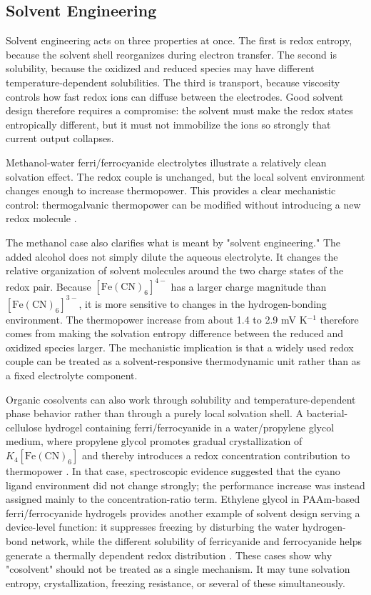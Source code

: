 \documentclass[a4paper,12pt]{report}
\begin{document}
\subsection{Solvent Engineering}

Solvent engineering acts on three properties at once. The first is redox
entropy, because the solvent shell reorganizes during electron transfer. The
second is solubility, because the oxidized and reduced species may have
different temperature-dependent solubilities. The third is transport, because
viscosity controls how fast redox ions can diffuse between the electrodes.
Good solvent design therefore requires a compromise: the solvent must make the
redox states entropically different, but it must not immobilize the ions so
strongly that current output collapses.

Methanol-water ferri/ferrocyanide electrolytes illustrate a relatively clean
solvation effect. The redox couple is unchanged, but the local solvent
environment changes enough to increase thermopower. This provides a clear
mechanistic control: thermogalvanic thermopower can be modified
without introducing a new redox molecule \citep{kim2017high}.

The methanol case also clarifies what is meant by "solvent engineering." The
added alcohol does not simply dilute the aqueous electrolyte. It changes the
relative organization of solvent molecules around the two charge states of the
redox pair. Because $[\mathrm{Fe(CN)}_6]^{4-}$ has a larger charge magnitude
than $[\mathrm{Fe(CN)}_6]^{3-}$, it is more sensitive to changes in the
hydrogen-bonding environment. The thermopower increase from about 1.4 to
2.9 mV K$^{-1}$ therefore comes from making the solvation entropy difference
between the reduced and oxidized species larger. The mechanistic implication is
that a widely used redox couple can be treated as a solvent-responsive
thermodynamic unit rather than as a fixed electrolyte component.

Organic cosolvents can also work through solubility and temperature-dependent
phase behavior rather than through a purely local solvation shell. A
bacterial-cellulose hydrogel containing ferri/ferrocyanide
in a water/propylene glycol medium, where propylene glycol promotes gradual
crystallization of $K_4[\mathrm{Fe(CN)}_6]$ and thereby introduces a redox
concentration contribution to thermopower \citep{yin2023bacterial}. In that
case, spectroscopic evidence suggested that the cyano ligand environment did
not change strongly; the performance increase was instead assigned mainly to
the concentration-ratio term. Ethylene glycol in PAAm-based ferri/ferrocyanide
hydrogels provides another example of solvent design serving a device-level
function: it suppresses freezing by disturbing the water hydrogen-bond network,
while the different solubility of ferricyanide and ferrocyanide helps generate
a thermally dependent redox distribution \citep{liu2024subzero}. These cases
show why "cosolvent" should not be treated as a single mechanism. It may tune
solvation entropy, crystallization, freezing resistance, or several of these
simultaneously.
\end{document}
